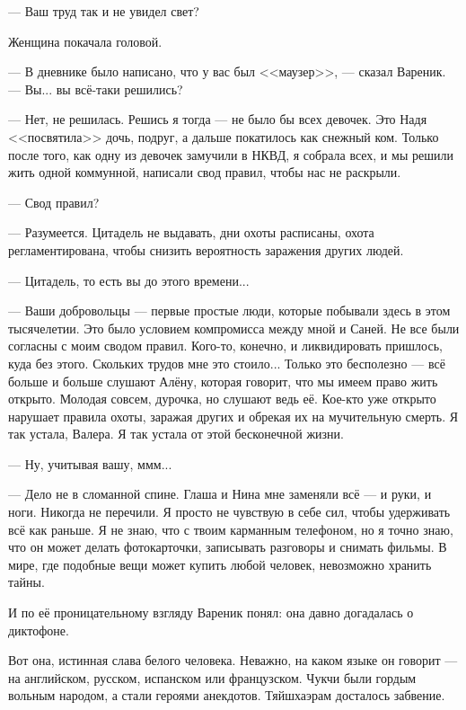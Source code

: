 --- Ваш труд так и не увидел свет?

Женщина покачала головой.

--- В дневнике было написано, что у вас был <<маузер>>, --- сказал Вареник.
--- Вы... вы всё-таки решились?

--- Нет, не решилась.
Решись я тогда --- не было бы всех девочек.
Это Надя <<посвятила>> дочь, подруг, а дальше покатилось как снежный ком.
Только после того, как одну из девочек замучили в НКВД, я собрала всех, и мы решили жить одной коммунной, написали свод правил, чтобы нас не раскрыли.

--- Свод правил?

--- Разумеется.
Цитадель не выдавать, дни охоты расписаны, охота регламентирована, чтобы снизить вероятность заражения других людей.

--- Цитадель, то есть вы до этого времени...

--- Ваши добровольцы --- первые простые люди, которые побывали здесь в этом тысячелетии.
Это было условием компромисса между мной и Саней.
Не все были согласны с моим сводом правил.
Кого-то, конечно, и ликвидировать пришлось, куда без этого.
Скольких трудов мне это стоило...
Только это бесполезно --- всё больше и больше слушают Алёну, которая говорит, что мы имеем право жить открыто.
Молодая совсем, дурочка, но слушают ведь её.
Кое-кто уже открыто нарушает правила охоты, заражая других и обрекая их на мучительную смерть.
Я так устала, Валера.
Я так устала от этой бесконечной жизни.

--- Ну, учитывая вашу, ммм...

--- Дело не в сломанной спине.
Глаша и Нина мне заменяли всё --- и руки, и ноги.
Никогда не перечили.
Я просто не чувствую в себе сил, чтобы удерживать всё как раньше.
Я не знаю, что с твоим карманным телефоном, но я точно знаю, что он может делать фотокарточки, записывать разговоры и снимать фильмы.
В мире, где подобные вещи может купить любой человек, невозможно хранить тайны.

И по её проницательному взгляду Вареник понял: она давно догадалась о диктофоне.

\asterism

\textspace

Вот она, истинная слава белого человека.
Неважно, на каком языке он говорит --- на английском, русском, испанском или французском.
Чукчи были гордым вольным народом, а стали героями анекдотов.
Тяйшхаэрам досталось забвение.

\chapter{}

